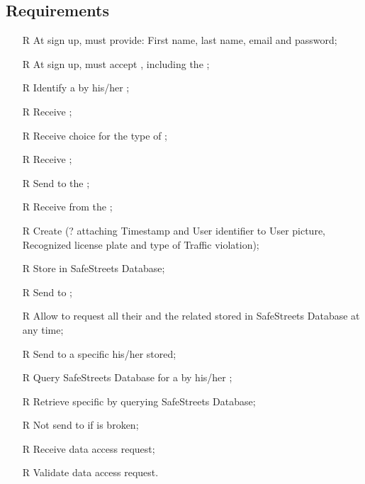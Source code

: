 \documentclass[../../../rasd.tex]{subfiles}
\begin{document}
\subsection{Requirements\label{sect:3.2.5}}
\begin{itemize}
	
	
	\item[R\subs{1}]At sign up,  must provide: First name, last name, email and password;
	\item[R\subs{2}]At sign up,  must accept , including the ;
	\item[R\subs{3}]Identify a  by his/her ;
	\item[R\subs{4}]Receive ;
	\item[R\subs{5}]Receive  choice for the type of ;
	\item[R\subs{6}]Receive ;
	\item[R\subs{7}]Send  to the ;
	\item[R\subs{8}]Receive  from the ;
	\item[R\subs{9}]Create  (? attaching Timestamp and User identifier to User picture, Recognized license plate and type of Traffic violation);
	\item[R\subs{10}]Store  in SafeStreets Database;
	\item[R\subs{11}]Send  to ;
	\item[R\subs{12a}]Allow  to request all their  and the related  stored in SafeStreets Database at any time;
	\item[R\subs{12b}]Send to a specific  his/her  stored;
	\item[R\subs{13}]Query SafeStreets Database for a  by his/her ;
	\item[R\subs{14}]Retrieve specific  by querying SafeStreets Database;
	\item[R\subs{15}]Not send  to  if  is broken;
	\item[R\subs{16}]Receive  data access request;
	\item[R\subs{17}]Validate  data access request.

\end{itemize}
\end{document}

